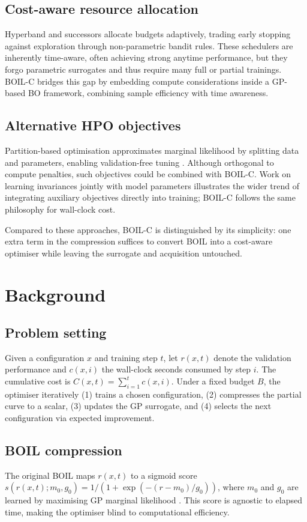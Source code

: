 \documentclass{article} %
\begin{document}
\subsection{Cost-aware resource allocation}
Hyperband and successors allocate budgets adaptively, trading early stopping against exploration through non-parametric bandit rules. These schedulers are inherently time-aware, often achieving strong anytime performance, but they forgo parametric surrogates and thus require many full or partial trainings. BOIL-C bridges this gap by embedding compute considerations inside a GP-based BO framework, combining sample efficiency with time awareness.

\subsection{Alternative HPO objectives}
Partition-based optimisation approximates marginal likelihood by splitting data and parameters, enabling validation-free tuning \cite{mlodozeniec-2023-hyperparameter}. Although orthogonal to compute penalties, such objectives could be combined with BOIL-C. Work on learning invariances jointly with model parameters \cite{benton-2020-learning} illustrates the wider trend of integrating auxiliary objectives directly into training; BOIL-C follows the same philosophy for wall-clock cost.

Compared to these approaches, BOIL-C is distinguished by its simplicity: one extra term in the compression suffices to convert BOIL into a cost-aware optimiser while leaving the surrogate and acquisition untouched.

\section{Background}
\label{sec:background}
\subsection{Problem setting}
Given a configuration \(x\) and training step \(t\), let \(r(x,t)\) denote the validation performance and \(c(x,i)\) the wall-clock seconds consumed by step \(i\). The cumulative cost is \(C(x,t)=\sum_{i=1}^{t}c(x,i)\). Under a fixed budget \(B\), the optimiser iteratively (1) trains a chosen configuration, (2) compresses the partial curve to a scalar, (3) updates the GP surrogate, and (4) selects the next configuration via expected improvement.

\subsection{BOIL compression}
The original BOIL maps \(r(x,t)\) to a sigmoid score \(s(r(x,t);m_0,g_0)=1/(1+\exp(-(r-m_0)/g_0))\), where \(m_0\) and \(g_0\) are learned by maximising GP marginal likelihood \cite{nguyen-2019-bayesian}. This score is agnostic to elapsed time, making the optimiser blind to computational efficiency.
\end{document}
